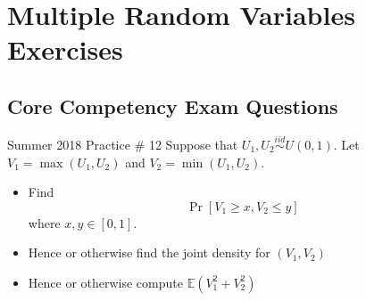\documentclass[../main]{subfiles}
\begin{document}
\chapter{Multiple Random Variables Exercises}
\section{Core Competency Exam Questions}
\begin{bbox}{Summer 2018 Practice \# 12}
Suppose that $U_1,U_2 \overset{iid}{\sim}U(0,1)$. Let $V_1 = \max (U_1, U_2)$ and $V_2 = \min(U_1, U_2)$.
\begin{itemize}
    \item Find \[
    \Pr[V_1 \ge x, V_2 \le y]
    \] where $x,y\in[0,1]$.
    \item Hence or otherwise find the joint density for $(V_1, V_2)$
    \item Hence or otherwise compute $\mathbb E(V_1^2 + V_2^2)$
\end{itemize}

\end{bbox}
\end{document}
